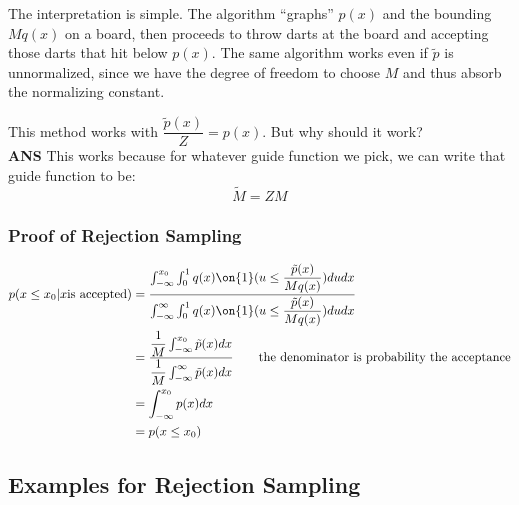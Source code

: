\documentclass{article}
\begin{document}

The interpretation is simple. The algorithm ``graphs'' $p(x)$ and the bounding $Mq(x)$ on a board, then proceeds to throw darts at the board and accepting those darts that hit below $p(x)$. The same algorithm works even if $\tilde p$ is unnormalized, since we have the degree of freedom to choose $M$ and thus absorb the normalizing constant.

This method works with $\dfrac{\tilde{p}(x)}{Z} = p(x) $. But why should it work?\\
\textbf{ANS} This works because for whatever guide function we pick, we can write that guide function to be: \[
\widetilde{M} = ZM
\]

\subsubsection{Proof of Rejection Sampling}
\begin{align*}
p(x \leq x_0 |x \text{is accepted})
& = \dfrac{ \int_{-\infty}^{x_0} \int_0^1 q(x) \on{1}(u \leq \dfrac{  \tilde{p}(x)  }{  Mq(x)  }) du dx }{ \int_{-\infty}^{\infty} \int_0^1 q(x) \on{1}(u \leq \dfrac{\tilde{p}(x)}{Mq(x)}) du dx  } \\
& = \dfrac{    \dfrac{1}{M} \int_{-\infty}^{x_0} \tilde{p}(x) dx }{   \dfrac{1}{M}  \int_{-\infty}^{\infty}  \tilde{p}(x) dx } \qquad \text{the denominator is probability the acceptance} \\
& = \int_{-\infty}^{x_0} p(x) dx \\
& = p(x \leq x_0)
\end{align*}

\subsection{Examples for Rejection Sampling}
\end{document}
